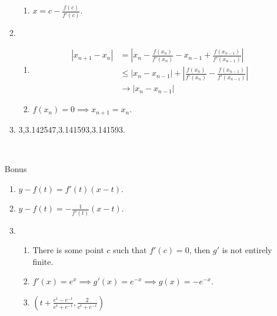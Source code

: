\documentclass[12pt]{article}
\begin{document}
\begin{enumerate}
\begin{enumerate}
\begin{enumerate}
                \item $x=c-\frac{f(c)}{f'(c)}$.
            \end{enumerate}
            \item \begin{enumerate}
                \item \begin{align*}
                    |x_{n+1}-x_n|&=|x_n-\frac{f(x_n)}{f'(x_n)}-x_{n-1}+\frac{f(x_{n-1})}{f'(x_{n-1})}|\\
                    &\leq |x_n-x_{n-1}|+|\frac{f(x_n)}{f'(x_n)}-\frac{f(x_{n-1})}{f'(x_{n-1})}|\\
                    &\to |x_n-x_{n-1}|
                \end{align*}
                \item $f(x_n)=0\implies x_{n+1}=x_n$.
            \end{enumerate}
            \item 3,3.142547,3.141593,3.141593.
        \end{enumerate}\
        \item [Bonus]\begin{enumerate}
            \item $y-f(t)=f'(t)(x-t)$.
            \item $y-f(t)=-\frac{1}{f'(t)}(x-t)$.
            \item \begin{enumerate}
                \item There is some point $c$ such that $f'(c)=0$, then $g'$ is not entirely finite.
                \item $f'(x)=e^x\implies g'(x)=e^{-x}\implies g(x)=-e^{-x}$.
                \item $(t+\frac{e^t-e^{-t}}{e^t+e^{-t}},\frac{2}{e^t+e^{-t}})$
            \end{enumerate}
        \end{enumerate}
    \end{enumerate}
\end{document}
